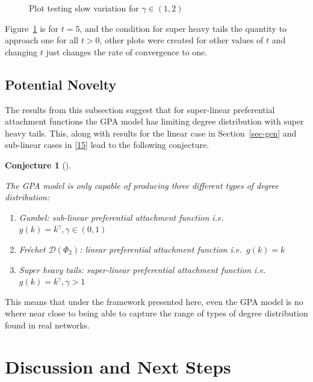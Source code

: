 \documentclass[
  10pt,
  a4paper,
]{scrreprt}
\providecommand{\tightlist}{%
  \setlength{\itemsep}{0pt}\setlength{\parskip}{0pt}}\usepackage{longtable,booktabs,array}
\theoremstyle{plain}
\newtheorem{conjecture}{Conjecture}[section]
\theoremstyle{definition}
\theoremstyle{plain}
\theoremstyle{remark}
\begin{document}
{\begin{figure}[H]
{}

\caption{\label{fig-shtail}Plot testing slow variation for
\(\gamma \in (1,2)\)}

\end{figure}

Figure~\ref{fig-shtail} is for \(t=5\), and the condition for super
heavy tails the quantity to approach one for all \(t>0\), other plots
were created for other values of \(t\) and changing \(t\) just changes
the rate of convergence to one.

\hypertarget{potential-novelty}{%
\section{Potential Novelty}\label{potential-novelty}}

The results from this subsection suggest that for super-linear
preferential attachment functions the GPA model has limiting degree
distribution with super heavy tails. This, along with results for the
linear case in Section~\ref{sec-gen} and sub-linear cases in
{[}\protect\hyperlink{ref-barabasibook}{15}{]} lead to the following
conjecture.

\begin{conjecture}[]\protect\hypertarget{cnj-gpa}{}\label{cnj-gpa}

The GPA model is only capable of producing three different types of
degree distribution:

\begin{enumerate}
\def\labelenumi{\arabic{enumi}.}
\tightlist
\item
  Gumbel: sub-linear preferential attachment function
  i.e.~\(g(k)=k^\gamma, \gamma\in(0,1)\)
\item
  Fréchet \(\mathcal D(\Phi_2)\): linear preferential attachment
  function i.e.~\(g(k)=k\)
\item
  Super heavy tails: super-linear preferential attachment function
  i.e.\(g(k)=k^\gamma, \gamma>1\)
\end{enumerate}

\end{conjecture}

This means that under the framework presented here, even the GPA model
is no where near close to being able to capture the range of types of
degree distribution found in real networks.

\hypertarget{discussion-and-next-steps}{%
\chapter{Discussion and Next Steps}\label{discussion-and-next-steps}}

}
\end{document}
